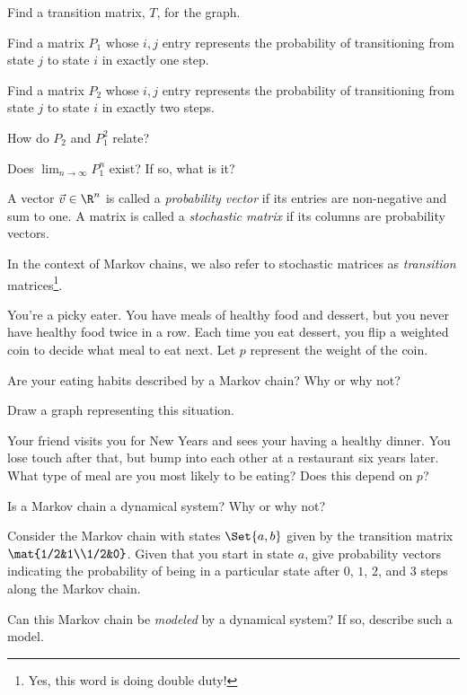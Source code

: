 	\begin{parts}
		\item Find a transition matrix, $T$, for the graph.
		\item Find a matrix $P_1$ whose $i,j$ entry represents the probability
			of transitioning from state $j$ to state $i$ in exactly one step.
		\item Find a matrix $P_2$ whose $i,j$ entry represents the probability
			of transitioning from state $j$ to state $i$ in exactly two steps.
		\item How do $P_2$ and $P_1^2$ relate?
		\item Does $\lim_{n\to\infty} P_1^n$ exist? If so, what is it?
	\end{parts}

	\begin{definition}
		A vector $\vec v\in \R^n$ is called a \emph{probability vector} if its entries are non-negative and sum to
		one. A matrix is called a \emph{stochastic matrix} if its columns are probability vectors.
	\end{definition}

	In the context of Markov chains, we also refer to stochastic matrices as \emph{transition} matrices\footnote{ Yes, this word
	is doing double duty!}.

	\question
	You're a picky eater. You have meals of healthy food and dessert, but you never have healthy food twice in a row.
	Each time you eat dessert, you flip a weighted coin to decide what meal to eat next. Let $p$ represent the weight of
	the coin.
	\begin{parts}
		\item Are your eating habits described by a Markov chain? Why or why not?
		\item Draw a graph representing this situation.
		\item Your friend visits you for New Years and sees your having a healthy dinner. You lose touch
			after that, but bump into each other at a restaurant six years later. What type of meal are
			you most likely to be eating? Does this depend on $p$?
	\end{parts}

	\question
	\begin{parts}
		\item Is a Markov chain a dynamical system? Why or why not?
		\item Consider the Markov chain with states $\Set{a,b}$
			given by the transition matrix $\mat{1/2&1\\1/2&0}$. Given 
			that you start in state $a$, give probability vectors indicating the 
			probability of being in a particular state after $0$, $1$, $2$, and $3$ steps
			along the Markov chain.
		\item Can this Markov chain be \emph{modeled} by a dynamical system? If so, describe
			such a model.
	\end{parts}

